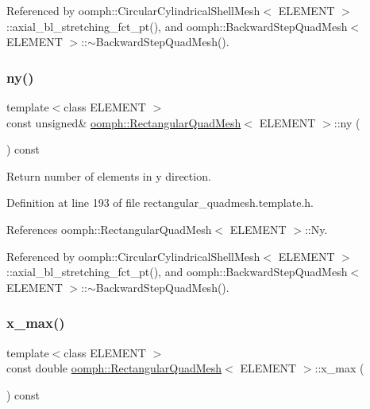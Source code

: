 Referenced by oomph\+::\+Circular\+Cylindrical\+Shell\+Mesh$<$ E\+L\+E\+M\+E\+N\+T $>$\+::axial\+\_\+bl\+\_\+stretching\+\_\+fct\+\_\+pt(), and oomph\+::\+Backward\+Step\+Quad\+Mesh$<$ E\+L\+E\+M\+E\+N\+T $>$\+::$\sim$\+Backward\+Step\+Quad\+Mesh().

\mbox{\label{classoomph_1_1RectangularQuadMesh_a86d76a55eb7c4e8bca9b74d23c8b0412}} 
\subsubsection{\texorpdfstring{ny()}{ny()}}
{\footnotesize\ttfamily template$<$class E\+L\+E\+M\+E\+NT $>$ \\
const unsigned\& \hyperlink{classoomph_1_1RectangularQuadMesh}{oomph\+::\+Rectangular\+Quad\+Mesh}$<$ E\+L\+E\+M\+E\+NT $>$\+::ny (\begin{DoxyParamCaption}{ }\end{DoxyParamCaption}) const\hspace{0.3cm}{\ttfamily [inline]}}



Return number of elements in y direction. 



Definition at line 193 of file rectangular\+\_\+quadmesh.\+template.\+h.



References oomph\+::\+Rectangular\+Quad\+Mesh$<$ E\+L\+E\+M\+E\+N\+T $>$\+::\+Ny.



Referenced by oomph\+::\+Circular\+Cylindrical\+Shell\+Mesh$<$ E\+L\+E\+M\+E\+N\+T $>$\+::axial\+\_\+bl\+\_\+stretching\+\_\+fct\+\_\+pt(), and oomph\+::\+Backward\+Step\+Quad\+Mesh$<$ E\+L\+E\+M\+E\+N\+T $>$\+::$\sim$\+Backward\+Step\+Quad\+Mesh().

\mbox{\label{classoomph_1_1RectangularQuadMesh_a3449b36a5e4fc4728e517bd38d7b0cc6}} 
\subsubsection{\texorpdfstring{x\+\_\+max()}{x\_max()}}
{\footnotesize\ttfamily template$<$class E\+L\+E\+M\+E\+NT $>$ \\
const double \hyperlink{classoomph_1_1RectangularQuadMesh}{oomph\+::\+Rectangular\+Quad\+Mesh}$<$ E\+L\+E\+M\+E\+NT $>$\+::x\+\_\+max (\begin{DoxyParamCaption}{ }\end{DoxyParamCaption}) const\hspace{0.3cm}{\ttfamily [inline]}}



